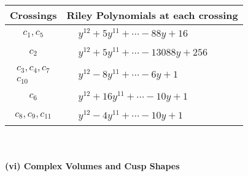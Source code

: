\documentclass[1p]{elsarticle_modified}
\theoremstyle{definition}
\begin{document}
\begin{tabular}{m{50pt}|m{274pt}}
Crossings & \hspace{64pt}Riley Polynomials at each crossing \\
\hline $$\begin{aligned}c_{1},c_{5}\end{aligned}$$&$\begin{aligned}
&y^{12}+5 y^{11}+\cdots-88 y+16
\end{aligned}$\\
\hline $$\begin{aligned}c_{2}\end{aligned}$$&$\begin{aligned}
&y^{12}+5 y^{11}+\cdots-13088 y+256
\end{aligned}$\\
\hline $$\begin{aligned}c_{3},c_{4},c_{7}\\c_{10}\end{aligned}$$&$\begin{aligned}
&y^{12}-8 y^{11}+\cdots-6 y+1
\end{aligned}$\\
\hline $$\begin{aligned}c_{6}\end{aligned}$$&$\begin{aligned}
&y^{12}+16 y^{11}+\cdots-10 y+1
\end{aligned}$\\
\hline $$\begin{aligned}c_{8},c_{9},c_{11}\end{aligned}$$&$\begin{aligned}
&y^{12}-4 y^{11}+\cdots-10 y+1
\end{aligned}$\\
\hline
\end{tabular}\\~\\
\newpage\flushleft \textbf{(vi) Complex Volumes and Cusp Shapes}
\end{document}
